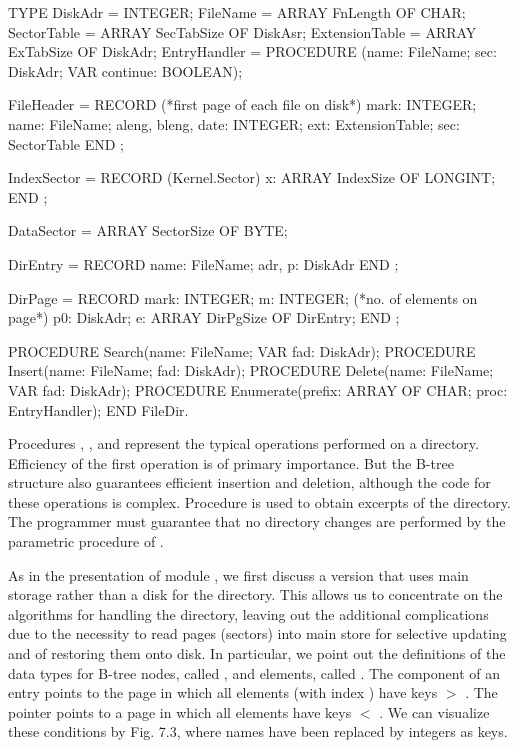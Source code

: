   TYPE DiskAdr = INTEGER;
    FileName = ARRAY FnLength OF CHAR;
    SectorTable = ARRAY SecTabSize OF DiskAsr;
    ExtensionTable = ARRAY ExTabSize OF DiskAdr;
    EntryHandler = PROCEDURE (name: FileName; sec: DiskAdr; VAR continue: BOOLEAN);
    
    FileHeader = RECORD (*first page of each file on disk*)
      mark: INTEGER;
      name: FileName;
      aleng, bleng, date: INTEGER;
      ext: ExtensionTable;
      sec: SectorTable
    END ;

    IndexSector = RECORD (Kernel.Sector)
      x: ARRAY IndexSize OF LONGINT;
    END ;
    
    DataSector = ARRAY SectorSize OF BYTE;
    
    DirEntry = RECORD
      name: FileName;
      adr, p: DiskAdr
    END ;
    
    DirPage = RECORD
      mark: INTEGER;
      m: INTEGER; (*no. of elements on page*)
      p0: DiskAdr;
      e: ARRAY DirPgSize OF DirEntry;
    END ;
    
  PROCEDURE Search(name: FileName; VAR fad: DiskAdr);
  PROCEDURE Insert(name: FileName; fad: DiskAdr);
  PROCEDURE Delete(name: FileName; VAR fad: DiskAdr);
  PROCEDURE Enumerate(prefix: ARRAY OF CHAR; proc: EntryHandler);
END FileDir.
\endtt

\noindent Procedures , , and  represent the typical operations performed on a directory. Efficiency of the first operation is of primary importance. But the B-tree structure also guarantees efficient insertion and deletion, although the code for these operations is complex. Procedure  is used to obtain excerpts of the directory. The programmer must guarantee that no directory changes are performed by the parametric procedure of .

As in the presentation of module , we first discuss a version that uses main storage rather than a disk for the directory. This allows us to concentrate on the algorithms for handling the directory, leaving out the additional complications due to the necessity to read pages (sectors) into main store for selective updating and of restoring them onto disk. In particular, we point out the definitions of the data types for B-tree nodes, called , and elements, called . The component  of an entry  points to the page in which all elements (with index ) have keys  $>$ . The pointer  points to a page in which all elements have keys  $<$ . We can visualize these conditions by Fig. 7.3, where names have been replaced by integers as keys.

